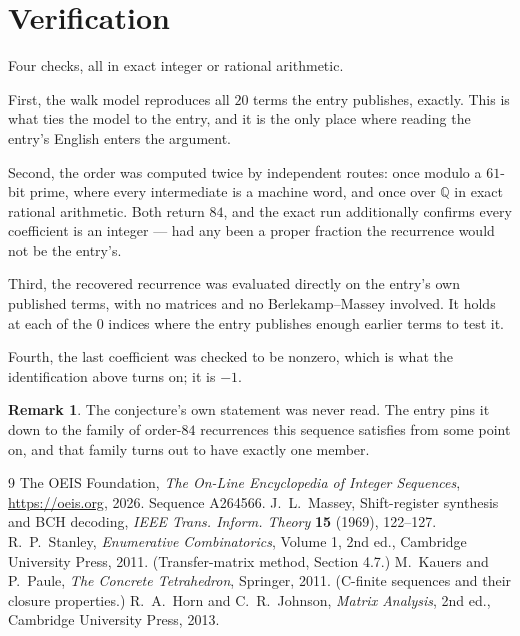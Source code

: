 \documentclass[11pt,a4paper]{article}
\theoremstyle{plain}
\theoremstyle{definition}
\newtheorem{remark}[theorem]{Remark}
\begin{document}
\section{Verification}

Four checks, all in exact integer or rational arithmetic.

First, the walk model reproduces all $20$ terms the entry publishes, exactly. This is
what ties the model to the entry, and it is the only place where reading the entry's English
enters the argument.

Second, the order was computed twice by independent routes: once modulo a $61$-bit prime, where
every intermediate is a machine word, and once over $\mathbb{Q}$ in exact rational arithmetic.
Both return $84$, and the exact run additionally confirms every coefficient is an integer
--- had any been a proper fraction the recurrence would not be the entry's.

Third, the recovered recurrence was evaluated directly on the entry's own published terms, with
no matrices and no Berlekamp--Massey involved. It holds at each of the $0$ indices where
the entry publishes enough earlier terms to test it.

Fourth, the last coefficient was checked to be nonzero, which is what the identification above
turns on; it is $-1$.

\begin{remark}
The conjecture's own statement was never read. The entry pins it down to the family of
order-$84$ recurrences this sequence satisfies from some point on, and that family turns
out to have exactly one member.
\end{remark}

\begin{thebibliography}{9}
 The OEIS Foundation, \emph{The On-Line Encyclopedia of Integer
Sequences}, \url{https://oeis.org}, 2026. Sequence A264566.
 J.~L.~Massey, Shift-register synthesis and BCH decoding, \emph{IEEE
Trans. Inform. Theory} \textbf{15} (1969), 122--127.
 R.~P.~Stanley, \emph{Enumerative Combinatorics}, Volume 1, 2nd ed.,
Cambridge University Press, 2011. (Transfer-matrix method, Section 4.7.)
 M.~Kauers and P.~Paule, \emph{The Concrete Tetrahedron}, Springer, 2011.
(C-finite sequences and their closure properties.)
 R.~A.~Horn and C.~R.~Johnson, \emph{Matrix Analysis}, 2nd ed., Cambridge
University Press, 2013.
\end{thebibliography}
\end{document}

